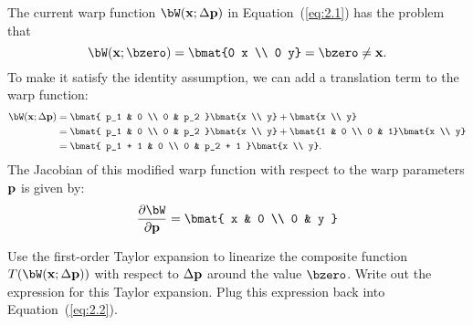 \begin{problem}
\begin{enumroman}
      \begin{answer}
        The current warp function $\bW(\bx; \Delta \bp)$ in Equation~(\ref{eq:2.1})
        has the problem that
        \[
          \bW(\bx; \bzero) = \bmat{0 x \\ 0 y} = \bzero \neq \bx.
        \]
        To make it satisfy the identity assumption, we can add a translation
        term to the warp function:
        \begin{align*}
          \bW(\bx; \Delta \bp) &=
          \bmat{ p_1 & 0 \\ 0 & p_2 }
          \bmat{x \\ y} + \bmat{x \\ y} \\
          &= \bmat{ p_1 & 0 \\ 0 & p_2 }
          \bmat{x \\ y} + \bmat{1 & 0 \\ 0 & 1} \bmat{x \\ y} \\
          &= \bmat{ p_1 + 1 & 0 \\ 0 & p_2 + 1 } \bmat{x \\ y}.
        \end{align*}
        The Jacobian of this modified warp function with respect to the warp
        parameters $\mathbf{p}$ is given by:
        \begin{equation}
          \frac{\partial \bW}{\partial \bp} =
          \bmat{ x & 0 \\ 0 & y }
          \label{eq:ans:2.1}
        \end{equation}\vspace{-1em}
      \end{answer}

    \item Use the first-order Taylor expansion to linearize the composite
      function $T(\bW(\bx; \Delta \bp))$ with respect to $\Delta \mathbf{p}$ around
      the value $\bzero$. Write out the expression for this Taylor expansion.
      Plug this expression back into Equation~(\ref{eq:2.2}).


\end{enumroman}
\end{problem}
